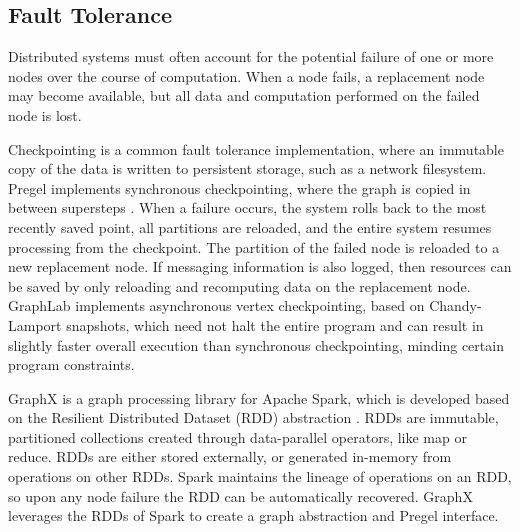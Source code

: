 \documentclass[reprint,twocolumn,showpacs,preprintnumbers,amsmath, aps,pre,amssymb]{revtex4-1}
\begin{document}
\subsection{Fault Tolerance}
\label{subsec:fault-tol}

Distributed systems must often account for the potential failure of one or more nodes over the course of computation.  When a node fails, a replacement node may become available, but all data and computation performed on the failed node is lost.

Checkpointing is a common fault tolerance implementation, where an immutable copy of the data is written to persistent storage, such as a network filesystem.  Pregel implements synchronous checkpointing, where the graph is copied in between supersteps \cite{Malewicz2010}.  When a failure occurs, the system rolls back to the most recently saved point, all partitions are reloaded, and the entire system resumes processing from the checkpoint.  The partition of the failed node is reloaded to a new replacement node.  If messaging information is also logged, then resources can be saved by only reloading and recomputing data  on the replacement node.  GraphLab \cite{Low2012} implements asynchronous vertex checkpointing, based on Chandy-Lamport \cite{Chandy1985} snapshots, which need not halt the entire program and can result in slightly faster overall execution than synchronous checkpointing, minding certain program constraints.

GraphX is a graph processing library for Apache Spark, which is developed based on the Resilient Distributed Dataset (RDD) abstraction \cite{Gonzalez2014}.  RDDs are immutable, partitioned collections created through data-parallel operators, like map or reduce.  RDDs are either stored externally, or generated in-memory from operations on other RDDs.  Spark maintains the lineage of operations on an RDD, so upon any node failure the RDD can be automatically recovered. GraphX leverages the RDDs of Spark to create a graph abstraction and Pregel interface.
\end{document}
